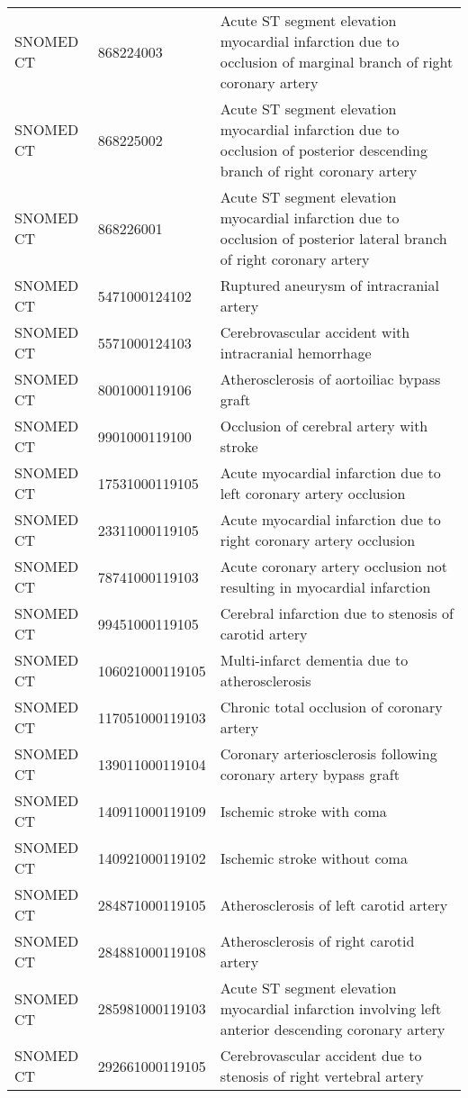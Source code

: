 \begin{longtable}{p{}p{}p{}}
  SNOMED CT & 868224003 & Acute ST segment elevation myocardial infarction due to occlusion of marginal branch of right coronary artery \\ 
  SNOMED CT & 868225002 & Acute ST segment elevation myocardial infarction due to occlusion of posterior descending branch of right coronary artery \\ 
  SNOMED CT & 868226001 & Acute ST segment elevation myocardial infarction due to occlusion of posterior lateral branch of right coronary artery \\ 
  SNOMED CT & 5471000124102 & Ruptured aneurysm of intracranial artery \\ 
  SNOMED CT & 5571000124103 & Cerebrovascular accident with intracranial hemorrhage \\ 
  SNOMED CT & 8001000119106 & Atherosclerosis of aortoiliac bypass graft \\ 
  SNOMED CT & 9901000119100 & Occlusion of cerebral artery with stroke \\ 
  SNOMED CT & 17531000119105 & Acute myocardial infarction due to left coronary artery occlusion \\ 
  SNOMED CT & 23311000119105 & Acute myocardial infarction due to right coronary artery occlusion \\ 
  SNOMED CT & 78741000119103 & Acute coronary artery occlusion not resulting in myocardial infarction \\ 
  SNOMED CT & 99451000119105 & Cerebral infarction due to stenosis of carotid artery \\ 
  SNOMED CT & 106021000119105 & Multi-infarct dementia due to atherosclerosis \\ 
  SNOMED CT & 117051000119103 & Chronic total occlusion of coronary artery \\ 
  SNOMED CT & 139011000119104 & Coronary arteriosclerosis following coronary artery bypass graft \\ 
  SNOMED CT & 140911000119109 & Ischemic stroke with coma \\ 
  SNOMED CT & 140921000119102 & Ischemic stroke without coma \\ 
  SNOMED CT & 284871000119105 & Atherosclerosis of left carotid artery \\ 
  SNOMED CT & 284881000119108 & Atherosclerosis of right carotid artery \\ 
  SNOMED CT & 285981000119103 & Acute ST segment elevation myocardial infarction involving left anterior descending coronary artery \\ 
  SNOMED CT & 292661000119105 & Cerebrovascular accident due to stenosis of right vertebral artery \\ 

\end{longtable}
